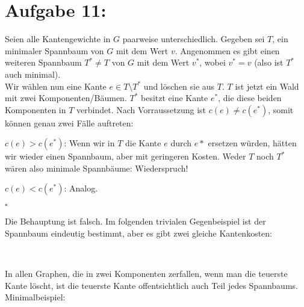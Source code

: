 \documentclass[11pt]{scrartcl} %
\begin{document}
\newpage
\section*{Aufgabe 11:}
\begin{compactenum}[(a)]
    \item Seien alle Kantengewichte in $G$ paarweise unterschiedlich. Gegeben sei $T$, ein minimaler Spannbaum von $G$ mit dem Wert $v$. Angenommen es gibt einen weiteren Spannbaum $T^* \ne T$ von $G$ mit dem Wert $v^*$, wobei $v^* = v$ (also ist $T^*$ auch minimal).\\
    Wir wählen nun eine Kante $e \in T \setminus T^*$ und löschen sie aus $T$. $T$ ist jetzt ein Wald mit zwei Komponenten/Bäumen. $T^*$ besitzt eine Kante $e^*$, die diese beiden Komponenten in $T$ verbindet. Nach Vorraussetzung ist $c(e) \ne c(e^*)$, somit können genau zwei Fälle auftreten:\\

    \begin{compactenum}[1.]
        \item $c(e) > c(e^*)$: Wenn wir in $T$ die Kante $e$ durch $e*$ ersetzen würden, hätten wir wieder einen Spannbaum, aber mit geringeren Kosten. Weder $T$ noch $T^*$ wären also minimale Spannbäume: Wiederspruch!
        \item $c(e) < c(e^*)$: Analog.
    \end{compactenum}
    \hfill $\square$\\

    \item Die Behauptung ist falsch. Im folgenden trivialen Gegenbeispiel ist der Spannbaum eindeutig bestimmt, aber es gibt zwei gleiche Kantenkosten:\\
    \begin{center}
    \\[0.5cm]
    \end{center}

    \item In allen Graphen, die in zwei Komponenten zerfallen, wenn man die teuerste Kante löscht, ist die teuerste Kante offentsichtlich auch Teil jedes Spannbaums. Minimalbeispiel:\\
    \begin{center}
    \end{center}

\end{compactenum}
\end{document}
